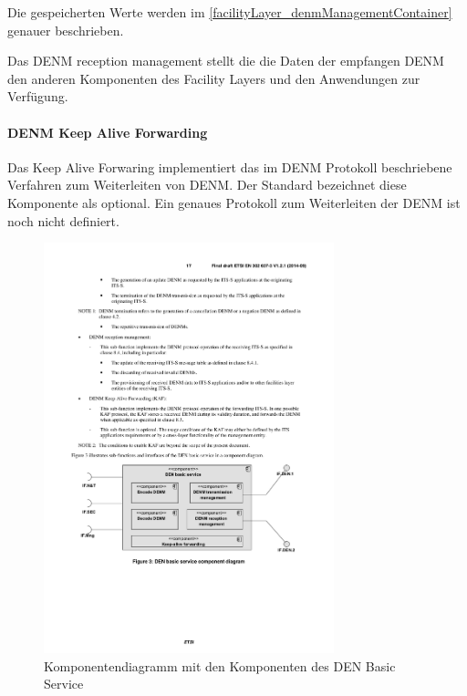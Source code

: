 Die gespeicherten Werte werden im \autoref{facilityLayer_denmManagementContainer} genauer beschrieben.

 
Das \ac{DENM} reception management stellt die die Daten der empfangen \ac{DENM} den anderen Komponenten des Facility Layers und den Anwendungen zur Verfügung.

\paragraph{DENM Keep Alive Forwarding}
Das Keep Alive Forwaring implementiert das im \ac{DENM} Protokoll beschriebene Verfahren zum Weiterleiten von \ac{DENM}. Der Standard \cite{en302637-3} bezeichnet diese Komponente als optional. Ein genaues Protokoll zum Weiterleiten der \ac{DENM} ist noch nicht definiert.




\begin{figure}[htbp]
	\includegraphics[width=0.75\textwidth]{content/images/04_facilitylayer/denBasicServiceKomponenten.pdf}
	\caption{Komponentendiagramm mit den Komponenten des DEN Basic Service \cite{en302637-3}}
	\label{fig:darstellungDenBasicServiceKomponenten}
\end{figure}

